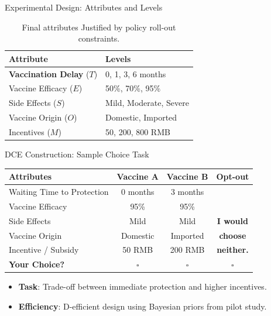 \documentclass[10pt]{beamer}
\begin{document}
\begin{frame}{Experimental Design: Attributes and Levels}
    \begin{table}
        \centering
        \small
        \begin{tabular}{ll}
            \toprule
            Attribute & Levels \\
            \midrule
            \textbf{Vaccination Delay} ($T$) & \alert{0, 1, 3, 6 months} \\
            Vaccine Efficacy ($E$) & 50\%, 70\%, 95\% \\
            Side Effects ($S$) & Mild, Moderate, Severe \\
            Vaccine Origin ($O$) & Domestic, Imported \\
            Incentives ($M$) & 50, 200, 800 RMB \\
            \bottomrule
        \end{tabular}
        \caption{Final attributes Justified by policy roll-out constraints.}
    \end{table}
\end{frame}

\begin{frame}{DCE Construction: Sample Choice Task}
    \begin{center}
        \renewcommand{\arraystretch}{1.3}
        \small
        \begin{tabular}{l|c|c|c}
            \hline
            \rowcolor{gray!20} \textbf{Attributes} & \textbf{Vaccine A} & \textbf{Vaccine B} & \textbf{Opt-out} \\
            \hline
            Waiting Time to Protection & \alert{0 months} & \alert{3 months} & \\
            Vaccine Efficacy & 95\% & 95\% & \\
            Side Effects & Mild & Mild & \textbf{I would} \\
            Vaccine Origin & Domestic & Imported & \textbf{choose} \\
            Incentive / Subsidy & 50 RMB & 200 RMB & \textbf{neither.} \\
            \hline
            \rowcolor{blue!5} \textbf{Your Choice?} & $\square$ & $\square$ & $\square$ \\
            \hline
        \end{tabular}
    \end{center}
    \vfill
    \begin{itemize}
        \item \textbf{Task}: Trade-off between \alert{immediate protection} and \alert{higher incentives}.
        \item \textbf{Efficiency}: D-efficient design using Bayesian priors from pilot study.
    \end{itemize}
\end{frame}
\end{document}
